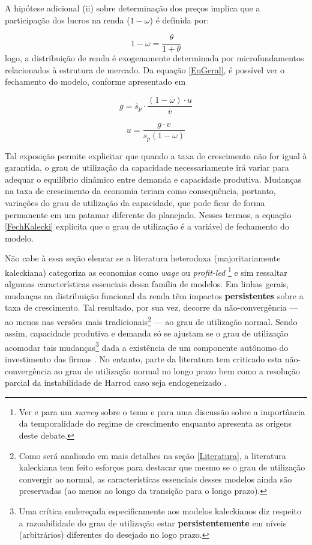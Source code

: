 A hipótese adicional (ii) sobre determinação dos preços implica que a participação dos lucros na renda ($1-\omega$) é definida por:

$$
1- \omega = \frac{\theta}{1+\theta}
$$
logo, a distribuição de renda é exogenamente determinada por microfundamentos relacionados à estrutura de mercado. 
Da equação \ref{EqGeral}, é possível ver o fechamento do modelo, conforme apresentado em \textcite{serrano_trouble_2017}

$$
g = \overline s_p\cdot \frac{(1-\overline\omega)\cdot u}{\overline v}
$$

\begin{equation}
\label{FechKalecki}
u = \frac{g\cdot v}{s_p(1-\omega)}
\end{equation}

Tal exposição permite explicitar que quando a taxa de crescimento não for igual à garantida, o grau de utilização da capacidade necessariamente irá variar para adequar o equilíbrio dinâmico entre demanda e capacidade produtiva.
Mudanças na taxa de crescimento da economia teriam como consequência, portanto, variações do grau de utilização da capacidade, que pode ficar de forma permanente em um patamar diferente do planejado.
Nesses termos, a equação \ref{FechKalecki} explicita que o grau de utilização é a variável de fechamento do modelo.


Não  cabe à essa seção elencar se a  literatura heterodoxa (majoritariamente kaleckiana)  categoriza as economias como \textit{wage} ou \textit{profit-led}
\footnote{Ver 
	\textcite{setterfield_distribution_2002} 
	e \textcite{onaran_is_2013} para um  \textit{survey} sobre o tema e \textcite{blecker_wage_led_2016} para uma discussão sobre a importância da temporalidade do regime de crescimento enquanto \textcite{lavoie_origins_2017} apresenta as origens deste debate.} 
e sim ressaltar algumas  características essenciais dessa família de modelos. Em linhas gerais, mudanças na distribuição funcional da renda têm impactos \textbf{persistentes} sobre a taxa de crescimento. 
Tal resultado, por sua vez, decorre da não-convergência --- ao menos nas versões mais tradicionais\footnote{Como será analisado em mais detalhes na seção \ref{Literatura}, a literatura kaleckiana tem feito esforços para destacar que mesmo se o grau de utilização convergir ao normal, as características essenciais desses modelos ainda são preservadas (ao menos ao longo da transição para o longo prazo).} --- ao grau de utilização normal. Sendo assim, capacidade produtiva e demanda só se ajustam se o grau de utilização acomodar tais mudanças\footnote{Uma crítica endereçada especificamente aos modelos kaleckianos diz respeito a razoabilidade do grau de utilização estar \textbf{persistentemente} em níveis (arbitrários) diferentes do desejado no logo prazo.} dada a existência de um componente autônomo do investimento das firmas \cite[p.~84--86]{serrano_sraffian_2017}.
No entanto, parte da literatura tem criticado esta não-convergência ao grau de utilização normal no longo prazo \cites{skott_finance_1988}{skott_theoretical_2012}
bem como a resolução parcial da instabilidade de Harrod caso seja endogeneizado \cites{hein_harrodian_2012}{allain_tackling_2015}{nah_long-run_2017}.

